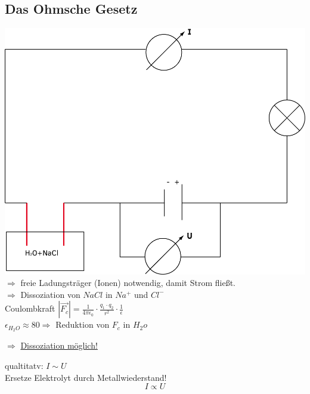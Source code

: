 \documentclass[11pt]{article}
\begin{document}
		\subsection{Das Ohmsche Gesetz}
		\includegraphics[width=0.7\linewidth]{skizzen/15/VL06/15_3} \\
		$\Rightarrow$ freie Ladungsträger (Ionen) notwendig, damit Strom fließt. \\
		$\Rightarrow$ Dissoziation von $NaCl$ in $Na^+$ und $Cl^-$ \\
		Coulombkraft $|\vec{F_c}| = \frac{1}{4\pi\epsilon_0} \cdot \frac{q_1 \cdot q_2}{r^2} \cdot \frac{1}{\epsilon}$ \\
		$\epsilon_{H_2O}\approx 80 \Rightarrow$ Reduktion von $F_c$ in $H_2o$\\
		\begin{center}
			$\Rightarrow$ \underline{Dissoziation möglich!}
		\end{center}
		qualtitatv: $I \sim U$ \\
		Ersetze Elektrolyt durch Metallwiederstand! \\
		$$I\propto U$$
		\\
\end{document}
